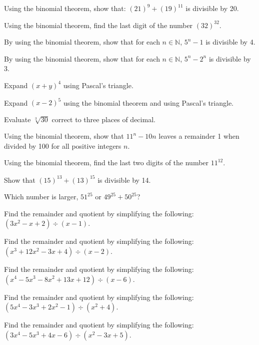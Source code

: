 \documentclass[11pt,a4paper]{article}
\begin{document}
\begin{shortlist}
\item Using the binomial theorem, show that: $(21)^9+(19)^{11}$ is divisible by 20.

\item Using the binomial theorem, find the last digit of the number $(32)^{32}$.

\item By using the binomial theorem, show that for each $n\in\mathbb{N}$, $5^n-1$ is divisible by 4.

\item By using the binomial theorem, show that for each $n\in\mathbb{N}$, $5^n-2^n$ is divisible by 3.

\item Expand $(x+y)^4$ using Pascal's triangle.

\item Expand $(x-2)^5$ using the binomial theorem and using Pascal's triangle.

\item Evaluate $\sqrt[3]{30}$ correct to three places of decimal.

\item Using the binomial theorem, show that $11^n-10n$ leaves a remainder 1 when divided by 100 for all positive integers $n$.

\item Using the binomial theorem, find the last two digits of the number $11^{12}$.

\item Show that $(15)^{13}+(13)^{15}$ is divisible by 14.

\item Which number is larger, $51^{25}$ or $49^{25}+50^{25}$?

\item Find the remainder and quotient by simplifying the following: $(3x^2-x+2)\div(x-1)$.

\item Find the remainder and quotient by simplifying the following: $(x^3+12x^2-3x+4)\div(x-2)$.

\item Find the remainder and quotient by simplifying the following: $(x^4-5x^3-8x^2+13x+12)\div(x-6)$.

\item Find the remainder and quotient by simplifying the following: $(5x^4-3x^3+2x^2-1)\div(x^2+4)$.

\item Find the remainder and quotient by simplifying the following: $(3x^4-5x^3+4x-6)\div(x^2-3x+5)$.


\end{shortlist}
\end{document}
